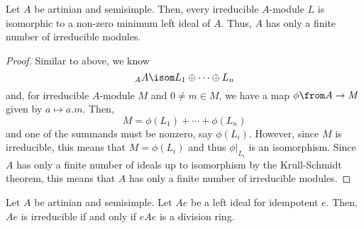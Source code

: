 \documentclass[11pt,leqno,oneside]{amsbook}
\numberwithin{thm}{section}
\begin{document}
\begin{thm}
  Let \(A\) be artinian and semisimple. Then, every irreducible
  \(A\)-module \(L\) is isomorphic to a non-zero minimum left ideal of
  \(A\). Thus, \(A\) has only a finite number of irreducible modules.
\end{thm}
\begin{proof}
  Similar to above, we know \[
    {}_A A \isom L_1 \oplus \cdots \oplus L_n
  \]
  and, for irreducible \(A\)-module \(M\) and \(0 \neq m \in M\), we have a map \(\phi \from
  A \to M\) given by \(a \mapsto a.m\). Then, \[
    M = \phi(L_1) + \cdots + \phi(L_n)
  \]
  and one of the summands must be nonzero, say \(\phi(L_i)\). However,
  since \(M\) is irreducible, this means that \(M = \phi(L_i)\) and
  thus \(\phi|_{L_i}\) is an isomorphism. Since \(A\) has only a
  finite number of ideals up to isomorphism by the Krull-Schmidt
  theorem, this means that \(A\) has 
  only a finite number of irreducible modules. 
\end{proof}
\begin{thm}
  Let \(A\) be artinian and semisimple. Let \(Ae\) be a left ideal for
  idempotent \(e\). Then, \(Ae\) is irreducible if and only if \(eAe\)
  is a division ring.
\end{thm}
\end{document}
